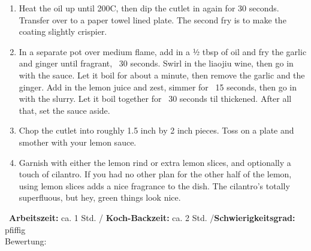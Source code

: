 \begin{minipage}[t]{0.58\textwidth}
\begin{enumerate}[leftmargin=*, itemindent=14pt]
\item Heat the oil up until 200C, then dip the cutlet in again for 30 seconds.
Transfer over to a paper towel lined plate. The second fry is to make the
coating slightly crispier.

\item In a separate pot over medium flame, add in a ½ tbsp of oil and fry the
garlic and ginger until fragrant, ~30 seconds. Swirl in the liaojiu wine, then
go in with the sauce. Let it boil for about a minute, then remove the garlic and
the ginger. Add in the lemon juice and zest, simmer for ~15 seconds, then go in
with the slurry. Let it boil together for ~30 seconds til thickened. After all
that, set the sauce aside.

\item Chop the cutlet into roughly 1.5 inch by 2 inch pieces.  Toss on a plate
and smother with your lemon sauce.

\item Garnish with either the lemon rind or extra lemon slices, and optionally a
touch of cilantro. If you had no other plan for the other half of the lemon,
using lemon slices adds a nice fragrance to the dish. The cilantro’s totally
superfluous, but hey, green things look nice.
\end{enumerate}
\end{minipage}
\vfill
\decothreeright \, \textbf{Arbeitszeit:} ca. 1 Std. / \textbf{Koch-Backzeit:} ca. 2 Std. /\textbf{Schwierigkeitsgrad:} pfiffig \decothreeleft \hfill \\ Bewertung:  \Circle  \Circle \Circle \Circle \Circle
